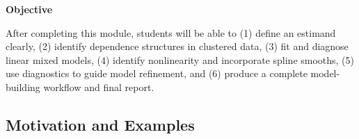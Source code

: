 \documentclass[
  letterpaper,
  DIV=11,
  numbers=noendperiod]{scrreprt}
\begin{document}

\textbf{Objective}

After completing this module, students will be able to (1) define an
estimand clearly, (2) identify dependence structures in clustered data,
(3) fit and diagnose linear mixed models, (4) identify nonlinearity and
incorporate spline smooths, (5) use diagnostics to guide model
refinement, and (6) produce a complete model-building workflow and final
report.

\hypertarget{motivation-and-examples-11}{%
\subsection*{Motivation and Examples}\label{motivation-and-examples-11}}
\end{document}
